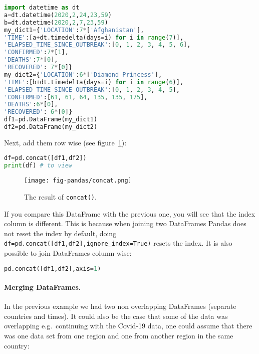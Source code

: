 \documentclass[graybox,sectrefs,envcountresetchap,open=right,final]{svmonodo}
\begin{document}
\begin{lstlisting}[language=python,style=blue1bar]
import datetime as dt
a=dt.datetime(2020,2,24,23,59)
b=dt.datetime(2020,2,7,23,59)
my_dict1={'LOCATION':7*['Afghanistan'], 
'TIME':[a+dt.timedelta(days=i) for i in range(7)],
'ELAPSED_TIME_SINCE_OUTBREAK':[0, 1, 2, 3, 4, 5, 6],
'CONFIRMED':7*[1],
'DEATHS':7*[0],
'RECOVERED': 7*[0]}
my_dict2={'LOCATION':6*['Diamond Princess'], 
'TIME':[b+dt.timedelta(days=i) for i in range(6)],
'ELAPSED_TIME_SINCE_OUTBREAK':[0, 1, 2, 3, 4, 5],
'CONFIRMED':[61, 61, 64, 135, 135, 175],
'DEATHS':6*[0],
'RECOVERED': 6*[0]}
df1=pd.DataFrame(my_dict1)
df2=pd.DataFrame(my_dict2)

\end{lstlisting}

Next, add them row wise (see figure~\ref{fig:pandas:concat}):




\begin{lstlisting}[language=python,style=blue1bar]
df=pd.concat([df1,df2])
print(df) # to view

\end{lstlisting}


\begin{figure}[!ht]  %
  \centerline{\texttt{[image: fig-pandas/concat.png]}}
  \caption{
  The result of \texttt{concat()}. \label{fig:pandas:concat}
  }
\end{figure}

If you compare this DataFrame with the previous one, you will see that the index column is different. This is because when joining two DataFrames Pandas does not reset the index by default, doing \Verb!df=pd.concat([df1,df2],ignore_index=True)! resets the index. It is also possible to join DataFrames column wise:


\begin{lstlisting}[language=python,style=blue1bar]
pd.concat([df1,df2],axis=1)

\end{lstlisting}


\paragraph{Merging DataFrames.}
In the previous example we had two non overlapping DataFrames (separate countries and times). It could also be the case that some of the data was overlapping e.g.~continuing with the Covid-19 data, one could assume that there was one data set from one region and one from another region in the same country:
\end{document}
